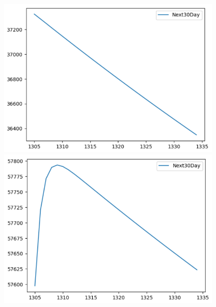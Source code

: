 \begin{figure}[H]
\begin{minipage}{0.15\textwidth}
    \centering
    \includegraphics[width=1\textwidth]{resources/chapter-5/newdata/predicted/BIDV_VARMA_9-1_30days.png}
    \end{minipage}
    \hfill
    \begin{minipage}{0.15\textwidth}
    \centering
    \includegraphics[width=1\textwidth]{resources/chapter-5/newdata/predicted/VCB_VARMA_7-3_30days.png}
    \end{minipage}
    \hfill
    \begin{minipage}{0.15\textwidth}
    \centering

\end{minipage}
\end{figure}
